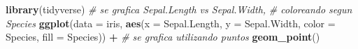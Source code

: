 \documentclass[ignorenonframetext,]{beamer}
\newenvironment{Shaded}{\begin{snugshade}}{\end{snugshade}}
\newcommand{\CommentTok}[1]{\textcolor[rgb]{0.56,0.35,0.01}{\textit{#1}}}
\newcommand{\DataTypeTok}[1]{\textcolor[rgb]{0.13,0.29,0.53}{#1}}
\newcommand{\KeywordTok}[1]{\textcolor[rgb]{0.13,0.29,0.53}{\textbf{#1}}}
\newcommand{\NormalTok}[1]{#1}
\newcommand{\OperatorTok}[1]{\textcolor[rgb]{0.81,0.36,0.00}{\textbf{#1}}}
\newcommand{\StringTok}[1]{\textcolor[rgb]{0.31,0.60,0.02}{#1}}
\begin{document}
\begin{frame}[fragile]{}
\protect\hypertarget{section-12}{}


\begin{Shaded}
\begin{Highlighting}[]
\KeywordTok{library}\NormalTok{(tidyverse)}
  \CommentTok{# se grafica Sepal.Length vs Sepal.Width,}
  \CommentTok{# coloreando segun Species}
\KeywordTok{ggplot}\NormalTok{(}\DataTypeTok{data =}\NormalTok{ iris,}
          \KeywordTok{aes}\NormalTok{(}\DataTypeTok{x =}\NormalTok{ Sepal.Length, }
              \DataTypeTok{y =}\NormalTok{ Sepal.Width, }
              \DataTypeTok{color =}\NormalTok{ Species, }
              \DataTypeTok{fill =}\NormalTok{ Species)) }\OperatorTok{+}
\StringTok{  }\CommentTok{# se grafica utilizando puntos}
\StringTok{  }\KeywordTok{geom_point}\NormalTok{() }
\end{Highlighting}
\end{Shaded}

\end{frame}
\end{document}
